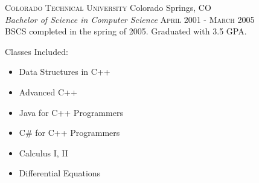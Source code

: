 
\textsc{Colorado Technical University} \hfill Colorado Springs, CO\\
\emph{Bachelor of Science in Computer Science} \hfill \textsc{April 2001} - \textsc{March 2005}\\
BSCS completed in the spring of 2005.  Graduated with 3.5 GPA.

Classes Included:
\begin{itemize}
\item Data Structures in C++
\item Advanced C++
\item Java for C++ Programmers
\item C\# for C++ Programmers
\item Calculus I, II
\item Differential Equations
\end{itemize}
